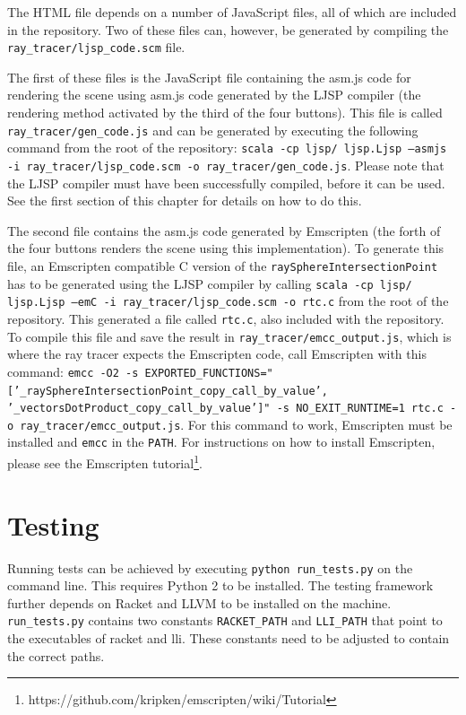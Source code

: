 \documentclass[11pt]{report}
\begin{document}
The HTML file depends on a number of JavaScript files, all of which are included in the repository. Two of these files can, however, be generated by compiling the \texttt{ray_tracer/ljsp_code.scm} file.

The first of these files is the JavaScript file containing the asm.js code for rendering the scene using asm.js code generated by the LJSP compiler (the rendering method activated by the third of the four buttons). This file is called \texttt{ray_tracer/gen_code.js} and can be generated by executing the following command from the root of the repository: \texttt{scala -cp ljsp/ ljsp.Ljsp --asmjs -i ray_tracer/ljsp_code.scm -o ray_tracer/gen_code.js}. Please note that the LJSP compiler must have been successfully compiled, before it can be used. See the first section of this chapter for details on how to do this.

The second file contains the asm.js code generated by Emscripten (the forth of the four buttons renders the scene using this implementation). To generate this file, an Emscripten compatible C version of the \texttt{raySphereIntersectionPoint} has to be generated using the LJSP compiler by calling \texttt{scala -cp ljsp/ ljsp.Ljsp --emC -i ray_tracer/ljsp_code.scm -o rtc.c} from the root of the repository. This generated a file called \texttt{rtc.c}, also included with the repository. To compile this file and save the result in \texttt{ray_tracer/emcc_output.js}, which is where the ray tracer expects the Emscripten code, call Emscripten with this command: \texttt{emcc -O2 -s EXPORTED_FUNCTIONS="['_raySphereIntersectionPoint_copy_call_by_value', '_vectorsDotProduct_copy_call_by_value']" -s NO_EXIT_RUNTIME=1 rtc.c -o ray_tracer/emcc_output.js}. For this command to work, Emscripten must be installed and \texttt{emcc} in the \texttt{PATH}. For instructions on how to install Emscripten, please see the Emscripten tutorial\footnote{https://github.com/kripken/emscripten/wiki/Tutorial}.

\section{Testing}
Running tests can be achieved by executing \texttt{python run_tests.py} on the command line. This requires Python 2 to be installed. The testing framework further depends on Racket and LLVM to be installed on the machine. \texttt{run_tests.py} contains two constants \texttt{RACKET_PATH} and \texttt{LLI_PATH} that point to the executables of racket and lli. These constants need to be adjusted to contain the correct paths.
\end{document}
